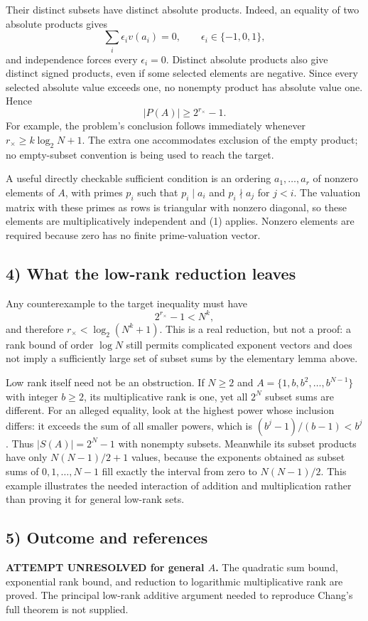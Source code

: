 Their distinct subsets have distinct absolute products. Indeed, an equality of two absolute products gives
\[
 \sum_i\epsilon_i v(a_i)=0,\qquad\epsilon_i\in\{-1,0,1\},
\]
and independence forces every $\epsilon_i=0$. Distinct absolute products also give distinct signed products, even if some selected elements are negative. Since every selected absolute value exceeds one, no nonempty product has absolute value one. Hence
\[
 |P(A)|\ge2^{r_\times}-1.\tag{1}
\]
For example, the problem's conclusion follows immediately whenever
$r_\times\ge k\log_2N+1$. The extra one accommodates exclusion of the empty product; no empty-subset convention is being used to reach the target.

A useful directly checkable sufficient condition is an ordering $a_1,\ldots,a_r$ of nonzero elements of $A$, with primes $p_i$ such that $p_i\mid a_i$ and $p_i\nmid a_j$ for $j<i$. The valuation matrix with these primes as rows is triangular with nonzero diagonal, so these elements are multiplicatively independent and (1) applies. Nonzero elements are required because zero has no finite prime-valuation vector.

\subsection*{4) What the low-rank reduction leaves}
Any counterexample to the target inequality must have
\[
 2^{r_\times}-1<N^k,
\]
and therefore $r_\times<\log_2(N^k+1)$. This is a real reduction, but not a proof: a rank bound of order $\log N$ still permits complicated exponent vectors and does not imply a sufficiently large set of subset sums by the elementary lemma above.

Low rank itself need not be an obstruction. If $N\ge2$ and
$A=\{1,b,b^2,\ldots,b^{N-1}\}$ with integer $b\ge2$, its multiplicative rank is one, yet all $2^N$ subset sums are different. For an alleged equality, look at the highest power whose inclusion differs: it exceeds the sum of all smaller powers, which is $(b^j-1)/(b-1)<b^j$. Thus $|S(A)|=2^N-1$ with nonempty subsets. Meanwhile its subset products have only $N(N-1)/2+1$ values, because the exponents obtained as subset sums of $0,1,\ldots,N-1$ fill exactly the interval from zero to $N(N-1)/2$. This example illustrates the needed interaction of addition and multiplication rather than proving it for general low-rank sets.

\subsection*{5) Outcome and references}
\textbf{ATTEMPT UNRESOLVED for general $A$.} The quadratic sum bound, exponential rank bound, and reduction to logarithmic multiplicative rank are proved. The principal low-rank additive argument needed to reproduce Chang's full theorem is not supplied.

